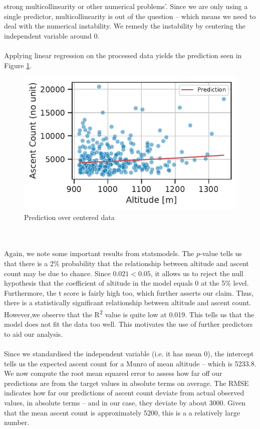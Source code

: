 \documentclass[11pt,a4paper]{article}
\begin{document}
strong multicollinearity or other numerical problems'. Since we are only using a single predictor, multicollinearity is out of the question – which means we need to deal with the numerical instability. We remedy the instability by centering the independent variable around 0. \\ \\
Applying linear regression on the processed data yields the prediction seen in Figure \ref{fds-project-template:fig:q1_prediction}.
\begin{figure} [h!]
  \centering
  \includegraphics{report/q1_prediction.pdf}
  \caption{Prediction over centered data}
  \label{fds-project-template:fig:q1_prediction}
\end{figure} \\ \\
Again, we note some important results from statsmodels. The $p$-value tells us that there is a 2\% probability that the relationship between altitude and ascent count may be due to chance. Since $0.021 < 0.05$, it allows us to reject the null hypothesis that the coefficient of altitude in the model equals 0 at the 5\% level. Furthermore, the t score is fairly high too, which further asserts our claim. Thus, there is a statistically significant relationship between altitude and ascent count. However,we observe that the R\textsuperscript{2} value is quite low at 0.019. This tells us that the model does not fit the data too well. This motivates the use of further predictors to aid our analysis. \\ \\
Since we standardised the independent variable (i.e. it has mean 0), the intercept tells us the expected ascent count for a Munro of mean altitude – which is 5233.8. We now compute the root mean squared error to assess how far off our predictions are from the target values in absolute terms on average. The RMSE indicates how far our predictions of ascent count deviate from actual observed values, in absolute terms – and in our case, they deviate by about 3000. Given that the mean ascent count is approximately 5200, this is a a relatively large number. \\ \\
\end{document}
